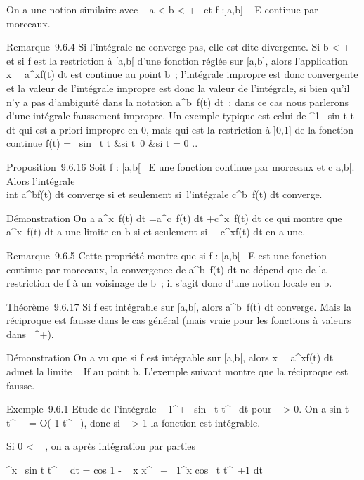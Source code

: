 On a une notion similaire avec -\infty~\leq a \textless{} b \textless{} +\infty~ et f
:{]}a,b{]} \rightarrow~ E continue par morceaux.

Remarque~9.6.4 Si l'intégrale ne converge pas, elle est dite divergente.
Si b \textless{} +\infty~ et si f est la restriction à {[}a,b{[} d'une
fonction réglée sur {[}a,b{]}, alors l'application
x\mapsto~\int ~
a^xf(t) dt est continue au point b~; l'intégrale impropre
est donc convergente et la valeur de l'intégrale impropre est donc la
valeur de l'intégrale, si bien qu'il n'y a pas d'ambiguïté dans la
notation \int  a^b~f(t) dt~; dans
ce cas nous parlerons d'une intégrale faussement impropre. Un exemple
typique est celui de ^1~
sin t \over t~ dt qui est a
priori impropre en 0, mais qui est la restriction à {]}0,1{]} de la
fonction continue f(t) = \left \
\cases  sin~ t
\over t &si t\neq~0
 &si t = 0 \cr 
\right ..

Proposition~9.6.16 Soit f : {[}a,b{[}\rightarrow~ E une fonction continue par
morceaux et c \in {[}a,b{[}. Alors l'intégrale \\int
 a^bf(t) dt converge si et seulement si~l'intégrale
\int  c^b~f(t) dt converge.

Démonstration On a \int  a^x~f(t)
dt =\int  a^c~f(t) dt
+\int  c^x~f(t) dt ce qui montre
que \int  a^x~f(t) dt a une
limite en b si et seulement si~\int ~
c^xf(t) dt en a une.

Remarque~9.6.5 Cette propriété montre que si f : {[}a,b{[}\rightarrow~ E est une
fonction continue par morceaux, la convergence de
\int  a^b~f(t) dt ne dépend que
de la restriction de f à un voisinage de b~; il s'agit donc d'une notion
locale en b.

Théorème~9.6.17 Si f est intégrable sur {[}a,b{[}, alors
\int  a^b~f(t) dt converge. Mais
la réciproque est fausse dans le cas général (mais vraie pour les
fonctions à valeurs dans \mathbb{R}~^+).

Démonstration On a vu que si f est intégrable sur {[}a,b{[}, alors
x\mapsto~\int ~
a^xf(t) dt admet la limite \int ~
If au point b. L'exemple suivant montre que la réciproque est
fausse.

Exemple~9.6.1 Etude de l'intégrale \int ~
1^+\infty~ sin~ t
\over t^\alpha~ dt pour \alpha~ \textgreater{} 0. On a
 sin t \over t^\alpha~~
= O( 1 \over t^\alpha~ ), donc si \alpha~
\textgreater{} 1 la fonction est intégrable.

Si 0 \textless{} \alpha~ , on a après intégration par parties

^x~
sin t \over t^\alpha~~ dt
= cos 1 - \cos~ x
\over x^\alpha~ +\int ~
1^x cos~ t
\over t^\alpha~+1 dt

